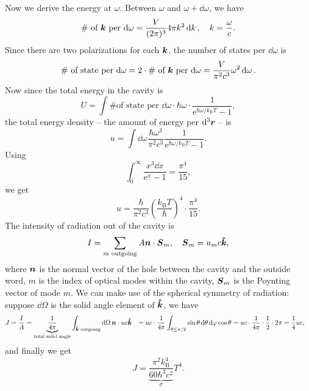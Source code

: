 \documentclass[hyperref, a4paper]{article}
\newcommand*{\ee}{\mathrm{e}}
\def\\{}%
\newcommand{\kB}{k_{\text{B}}}
\begin{document}
Now we derive the energy at $\omega$.
Between $\omega$ and $\omega + \dd{\omega}$, we have 
\[
    \text{\# of $\vb*{k}$ per $\dd{\omega}$} = 
    \frac{V}{(2\pi)^3} 4 \pi k^2 \dd{k}, \quad k = \frac{\omega}{c}.
\]
Since there are two polarizations for each $\vb*{k}$,
the number of states per $\dd{\omega}$ is 
\begin{equation}
    \text{\# of state per $\dd{\omega}$} 
    = 2 \cdot \text{\# of $\vb*{k}$ per $\dd{\omega}$} 
    = \frac{V}{\pi^2 c^3} \omega^2 \dd{\omega}.
\end{equation}
Now since the total energy in the cavity is 
\begin{equation}
    U = \int \text{\# of state per $\dd{\omega}$}  
    \cdot \hbar \omega \cdot \frac{1}{\ee^{\hbar \omega / \kB T} - 1},
\end{equation}
the total energy density -- the amount of energy per $\dd[3]{\vb*{r}}$ -- is 
\begin{equation}
    u = \int \dd{\omega} \frac{\hbar \omega^3}{\pi^2 c^3} 
    \frac{1}{\ee^{\hbar \omega / \kB T} - 1}.
\end{equation}
Using 
\[
    \int_0^\infty \frac{x^3 \dd{x}}{\ee^{x} - 1} = \frac{\pi^4}{15}, 
\]
we get 
\begin{equation}
    u = \frac{\hbar}{\pi^2 c^3} \left(\frac{\kB T}{\hbar}\right)^4 \cdot \frac{\pi^4}{15}.
\end{equation}
The intensity of radiation out of the cavity is 
\[
    I = \sum_{\text{$m$ outgoing}} A \vb*{n} \cdot \vb*{S}_{m}, 
    \quad \vb*{S}_m = u_m c \vu*{k},
\]
where $\vb*{n}$ is the normal vector of the hole between the cavity and the outside word, 
$m$ is the index of optical modes within the cavity,
$\vb*{S}_m$ is the Poynting vector of mode $m$.
We can make use of the spherical symmetry of radiation:
suppose $\dd{\Omega}$ is the solid angle element of $\vu*{k}$,
we have 
\[
    \begin{aligned}
        J = \frac{I}{A} &= 
        \underbrace{\frac{1}{4\pi}}_{\text{total solid angle}} 
        \int_{\text{$\vu*{k}$ outgoing}} \dd{\Omega}
        \vb*{n} \cdot u c \vu*{k} \\
        &= uc \cdot \frac{1}{4\pi} \int_{\theta \leq \pi / 2} \sin \theta \dd{\theta} \dd{\varphi}
        \cos \theta \\
        &= uc \cdot \frac{1}{4\pi} \cdot \frac{1}{2} \cdot 2 \pi = \frac{1}{4} u c,
    \end{aligned}
\]
and finally we get 
\begin{equation}
    J = \underbrace{
        \frac{\pi^2 \kB^4}{60 \hbar^3 c^2}
    }_\sigma T^4.
\end{equation}
\end{document}
